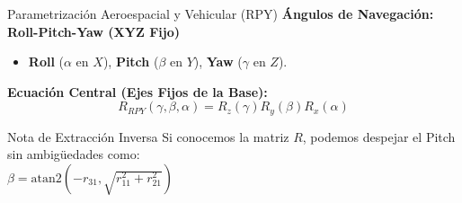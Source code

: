 \documentclass[aspectratio=169]{beamer}
\begin{document}
\begin{frame}{Parametrización Aeroespacial y Vehicular (RPY)}
    \textbf{Ángulos de Navegación: Roll-Pitch-Yaw (XYZ Fijo)}
    \begin{itemize}
        \item \textbf{Roll} ($\alpha$ en $X$), \textbf{Pitch} ($\beta$ en $Y$), \textbf{Yaw} ($\gamma$ en $Z$).
    \end{itemize}
    
    \vspace{0.2cm}
    \textbf{Ecuación Central (Ejes Fijos de la Base):}
    \begin{equation*}
        R_{RPY}(\gamma, \beta, \alpha) = R_z(\gamma) R_y(\beta) R_x(\alpha)
    \end{equation*}
    
    \vspace{0.1cm}
    \begin{center}
    \end{center}
    
    \vspace{0.3cm}
    \begin{exampleblock}{Nota de Extracción Inversa}
        Si conocemos la matriz $R$, podemos despejar el Pitch sin ambigüedades como: \\
        \centering $\beta = \text{atan2}(-r_{31}, \sqrt{r_{11}^2 + r_{21}^2})$
    \end{exampleblock}
\end{frame}
\end{document}
